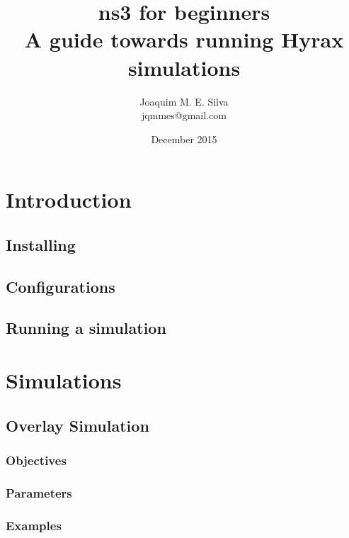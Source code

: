 \documentclass[a4paper]{book}
\begin{document}
\title{{\Huge ns3 for beginners} \\
\vspace{1em}\large A guide towards running Hyrax simulations\vspace{5em}}
\author{Joaquim M. E. Silva \\ jqmmes@gmail.com}
\date{December 2015}
\maketitle

\tableofcontents

\chapter{Introduction}

\section{Installing}

\section{Configurations}

\section{Running a simulation}


\chapter{Simulations}

\section{Overlay Simulation}

\subsection{Objectives}


\subsection{Parameters}

\subsection{Examples}
\end{document}
